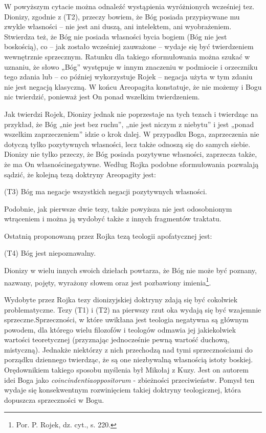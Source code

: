 W powyższym cytacie można odnaleźć wystąpienia wyróżnionych wcześniej
tez. Dionizy, zgodnie z (T2), przeczy bowiem, że Bóg posiada
przypisywane mu zwykle własności -- nie jest ani duszą, ani intelektem,
ani wyobrażeniem. Stwierdza też, że Bóg nie posiada własności bycia
bogiem (Bóg nie jest boskością), co -- jak zostało wcześniej zauważone –
wydaje się być twierdzeniem wewnętrznie sprzecznym. Ratunku dla takiego
sformułowania można szukać w uznaniu, że słowo „Bóg” występuje w innym
znaczeniu w podmiocie i orzeczniku tego zdania lub -- co później
wykorzystuje Rojek -- negacja użyta w tym zdaniu nie jest negacją
klasyczną. W końcu Areopagita konstatuje, że nie możemy i Bogu nic
twierdzić, ponieważ jest On ponad wszelkim twierdzeniem.

Jak twierdzi Rojek, Dionizy jednak nie poprzestaje na tych tezach i
twierdząc na przykład, że Bóg „nie jest bez ruchu”, „nie jest niczym z
niebytu” i jest „ponad wszelkim zaprzeczeniem” idzie o krok dalej. W
przypadku Boga, zaprzeczenia nie dotyczą tylko pozytywnych własności,
lecz także odnoszą się do samych siebie. Dionizy nie tylko przeczy, że
Bóg posiada pozytywne własności, zaprzecza także, że ma On
własnościnegatywne. Według Rojka podobne sformułowania pozwalają
sądzić, że kolejną tezą doktryny Areopagity jest:


\bigskip

\noindent (T3) Bóg ma negacje wszystkich negacji pozytywnych własności.


\bigskip

Podobnie, jak pierwsze dwie tezy, także powyższa nie jest odosobnionym
wtrąceniem i można ją wydobyć także z innych fragmentów traktatu.

Ostatnią proponowaną przez Rojka tezą teologii apofatycznej jest:


\bigskip

\noindent (T4) Bóg jest niepoznawalny.


\bigskip

Dionizy w wielu innych swoich dziełach powtarza, że Bóg nie może być
poznany, nazwany, pojęty, wyrażony słowem oraz jest pozbawiony
imienia\footnote{Por. P. Rojek, dz. cyt., s. 220. }.

Wydobyte przez Rojka tezy dionizyjskiej doktryny zdają się być cokolwiek
problematyczne. Tezy (T1) i (T2) na pierwszy rzut oka wydają się być
wzajemnie sprzeczne.Sprzeczności, w które uwikłana jest teologia
negatywna są głównym powodem, dla którego wielu filozofów i teologów
odmawia jej jakiekolwiek wartości teoretycznej (przyznając jednocześnie
pewną wartość duchową, mistyczną). Jednakże niektórzy z nich przechodzą
nad tymi sprzecznościami do porządku dziennego twierdząc, że są one
niezbywalną własnością istoty boskiej. Orędownikiem takiego sposobu
myślenia był Mikołaj z Kuzy. Jest on autorem idei Boga jako
\textit{coincindentiaoppositorum} -  zbieżności przeciwieństw. Pomysł
ten wydaje się konsekwentnym rozwinięciem takiej doktryny teologicznej,
która dopuszcza sprzeczności w Bogu.

